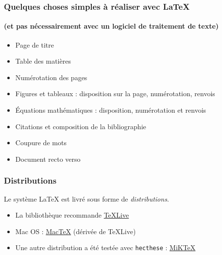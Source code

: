 \begin{frame}

	\frametitle{Quelques choses simples à réaliser avec {\LaTeX}}
	\framesubtitle{(et pas nécessairement avec un logiciel de traitement de texte)}
	
	\begin{itemize}
		\item Page de titre
		\item Table des matières
		\item Numérotation des pages
		\item Figures et tableaux : disposition sur la page, numérotation, renvois
		\item Équations mathématiques : disposition, numérotation et renvois
		\item Citations et composition de la bibliographie
		\item Coupure de mots
		\item Document recto verso
	\end{itemize}

\end{frame}


\begin{frame}[c]

	\frametitle{Distributions}
	
	Le système {\LaTeX} est livré sous forme de \emph{distributions}.
	
	\begin{itemize}
		\item La bibliothèque recommande \href{https://www.tug.org/texlive}{\TeX Live}
		\item Mac OS : \href{https://www.tug.org/mactex}{Mac\TeX} (dérivée de \TeX Live)
		\item Une autre distribution a été testée avec \texttt{hecthese} :
			\href{https://miktex.org/download}{MiK\TeX}
	\end{itemize}
\end{frame}